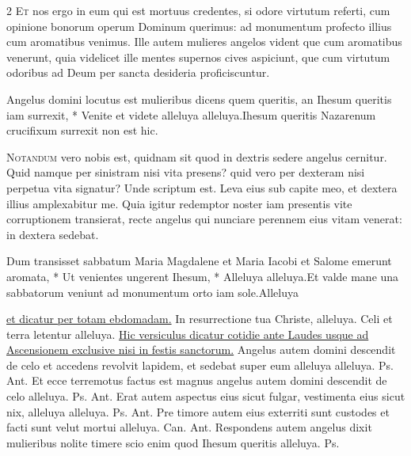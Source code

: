 \begin{multicols*}{2}
\lettrine[lines=2]{\zallmancaps \color{Red} E}{t} nos ergo in eum qui est mortuus credentes, si odore virtutum referti, cum opinione bonorum operum Dominum querimus: ad monumentum profecto illius cum aromatibus venimus. Ille autem mulieres angelos vident que cum aromatibus venerunt, quia videlicet ille mentes supernos cives aspiciunt, que cum virtutum odoribus ad Deum per sancta desideria proficiscuntur.
\begin{responsory}
{Angelus domini locutus est mulieribus dicens quem queritis, an Ihesum queritis iam surrexit, * Venite et videte alleluya alleluya.}{Ihesum queritis Nazarenum crucifixum surrexit non est hic.}
\end{responsory}%
\lettrine[lines=2]{\zallmancaps \color{Blue} N}{otandum} vero nobis est, quidnam sit quod in dextris sedere angelus cernitur. Quid namque per sinistram nisi vita presens? quid vero per dexteram nisi perpetua vita signatur? Unde scriptum est. Leva eius sub capite meo, et dextera illius amplexabitur me. Quia igitur redemptor noster iam presentis vite corruptionem transierat, recte angelus qui nunciare perennem eius vitam venerat: in dextera sedebat.
\begin{responsory-final}
{Dum transisset sabbatum Maria Magdalene et Maria Iacobi et Salome emerunt aromata, * Ut venientes ungerent Ihesum, * Alleluya alleluya.}{Et valde mane una sabbatorum veniunt ad monumentum orto iam sole.}{Alleluya}
\end{responsory-final}%
\newline {} \ul{et dicatur per totam ebdomadam.}
\newline \V In resurrectione tua Christe, alleluya. \R Celi et terra letentur alleluya.
\newline \ul{Hic versiculus dicatur cotidie ante Laudes usque ad Ascensionem exclusive nisi in festis sanctorum.}
 Angelus autem domini descendit de celo et accedens revolvit lapidem, et sedebat super eum alleluya alleluya. {\color{Red} Ps.}  {\color{Red} Ant.} Et ecce terremotus factus est magnus angelus autem domini descendit de celo alleluya. {\color{Red} Ps.}  {\color{Red} Ant.} Erat autem aspectus eius sicut fulgar, vestimenta eius sicut nix, alleluya alleluya. {\color{Red} Ps.}  {\color{Red} Ant.} Pre timore autem eius exterriti sunt custodes et facti sunt velut mortui alleluya. {\color{Red} Can.}  {\color{Red} Ant.} Respondens autem angelus dixit mulieribus nolite timere scio enim quod Ihesum queritis alleluya. {\color{Red} Ps.} 

\end{multicols*}
